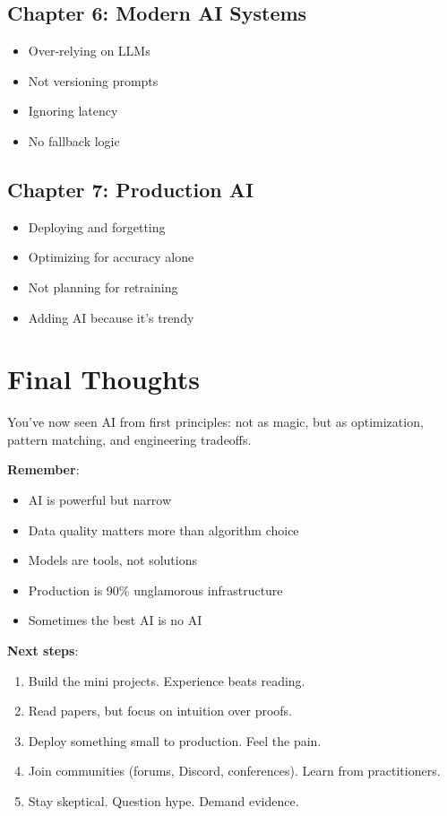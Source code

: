 \documentclass[11pt,oneside]{book}
\begin{document}
\section{Chapter 6: Modern AI Systems}

\begin{itemize}
    \item Over-relying on LLMs
    \item Not versioning prompts
    \item Ignoring latency
    \item No fallback logic
\end{itemize}

\section{Chapter 7: Production AI}

\begin{itemize}
    \item Deploying and forgetting
    \item Optimizing for accuracy alone
    \item Not planning for retraining
    \item Adding AI because it's trendy
\end{itemize}

\chapter*{Final Thoughts}

You've now seen AI from first principles: not as magic, but as optimization, pattern matching, and engineering tradeoffs.

\textbf{Remember}:
\begin{itemize}
    \item AI is powerful but narrow
    \item Data quality matters more than algorithm choice
    \item Models are tools, not solutions
    \item Production is 90\% unglamorous infrastructure
    \item Sometimes the best AI is no AI
\end{itemize}

\textbf{Next steps}:
\begin{enumerate}
    \item Build the mini projects. Experience beats reading.
    \item Read papers, but focus on intuition over proofs.
    \item Deploy something small to production. Feel the pain.
    \item Join communities (forums, Discord, conferences). Learn from practitioners.
    \item Stay skeptical. Question hype. Demand evidence.
\end{enumerate}
\end{document}
